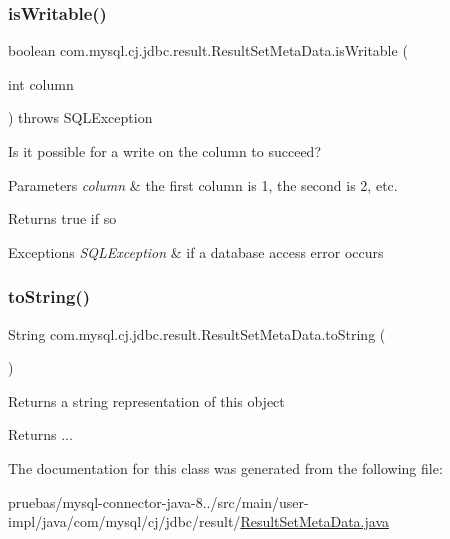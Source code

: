 \subsubsection{\texorpdfstring{is\+Writable()}{isWritable()}}
{\footnotesize\ttfamily boolean com.\+mysql.\+cj.\+jdbc.\+result.\+Result\+Set\+Meta\+Data.\+is\+Writable (\begin{DoxyParamCaption}\item[{int}]{column }\end{DoxyParamCaption}) throws S\+Q\+L\+Exception}

Is it possible for a write on the column to succeed?


\begin{DoxyParams}{Parameters}
{\em column} & the first column is 1, the second is 2, etc.\\
\hline
\end{DoxyParams}
\begin{DoxyReturn}{Returns}
true if so
\end{DoxyReturn}

\begin{DoxyExceptions}{Exceptions}
{\em S\+Q\+L\+Exception} & if a database access error occurs \\
\hline
\end{DoxyExceptions}
\mbox{\label{classcom_1_1mysql_1_1cj_1_1jdbc_1_1result_1_1_result_set_meta_data_a0eafbe5189d19f76e70a011104220551}} 
\subsubsection{\texorpdfstring{to\+String()}{toString()}}
{\footnotesize\ttfamily String com.\+mysql.\+cj.\+jdbc.\+result.\+Result\+Set\+Meta\+Data.\+to\+String (\begin{DoxyParamCaption}{ }\end{DoxyParamCaption})}

Returns a string representation of this object

\begin{DoxyReturn}{Returns}
... 
\end{DoxyReturn}


The documentation for this class was generated from the following file\+:\begin{DoxyCompactItemize}
\item 
pruebas/mysql-\/connector-\/java-\/8../src/main/user-\/impl/java/com/mysql/cj/jdbc/result/\mbox{\hyperlink{_result_set_meta_data_8java}{Result\+Set\+Meta\+Data.\+java}}\end{DoxyCompactItemize}
